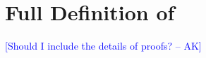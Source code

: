 \documentclass[master,english]{kuisthesis}
\newcommand{\AK}[1]{\textcolor{blue}{[#1 -- AK]}}
\begin{document}
\tableofcontents				%


















\Appendix

\newtheorem{dfn}{Definition}
\newtheorem{ex}{Example}
\newtheorem{cm}{Comment}
\newcommand{\figheader}[2]{
  \begin{flushleft}
    #2 {\bf \normalsize #1}
\end{flushleft}}

\section{Full Definition of \LMD}


\AK{Should I include the details of proofs?}

% 
\end{document}
